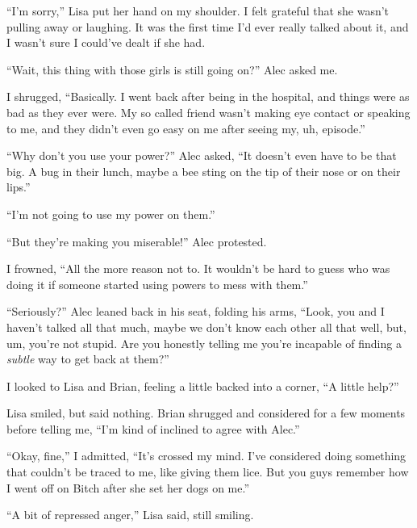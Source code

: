 ``I'm sorry,'' Lisa put her hand on my shoulder.  I felt grateful that she wasn't pulling away or laughing.  It was the first time I'd ever really talked about it, and I wasn't sure I could've dealt if she had.



``Wait, this thing with those girls is still going on?'' Alec asked me.



I shrugged, ``Basically.  I went back after being in the hospital, and things were as bad as they ever were.  My so called friend wasn't making eye contact or speaking to me, and they didn't even go easy on me after seeing my, uh, episode.''



``Why don't you use your power?''  Alec asked, ``It doesn't even have to be that big.  A bug in their lunch, maybe a bee sting on the tip of their nose or on their lips.''



``I'm not going to use my power on them.''



``But they're making you miserable!'' Alec protested.



I frowned, ``All the more reason not to.  It wouldn't be hard to guess who was doing it if someone started using powers to mess with them.''



``Seriously?'' Alec leaned back in his seat, folding his arms, ``Look, you and I haven't talked all that much, maybe we don't know each other all that well, but, um, you're not stupid.  Are you honestly telling me you're incapable of finding a \emph{subtle} way to get back at them?''



I looked to Lisa and Brian, feeling a little backed into a corner, ``A little help?''



Lisa smiled, but said nothing.  Brian shrugged and considered for a few moments before telling me, ``I'm kind of inclined to agree with Alec.''



``Okay, fine,'' I admitted, ``It's crossed my mind.  I've considered doing something that couldn't be traced to me, like giving them lice.  But you guys remember how I went off on Bitch after she set her dogs on me.''



``A bit of repressed anger,'' Lisa said, still smiling.



